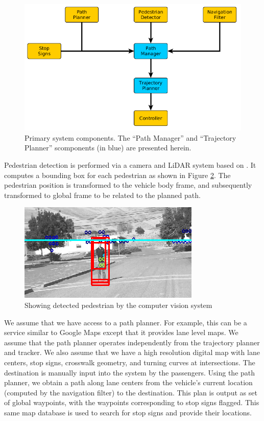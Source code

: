 \documentclass[letterpaper, 10 pt, conference]{ieeeconf}  %
\begin{document}
\begin{figure}[thpb]
  \centering
  \includegraphics[width=1.0\columnwidth]{graphics/MissingReactionPiece2.png}
  \caption{
   Primary system components. The ``Path Manager'' and ``Trajectory Planner'' scomponents (in blue) are presented herein.
  }
  \label{fig:addreact}
\end{figure}

Pedestrian detection is performed via a camera and LiDAR system based on \cite{Gepperth2013,Gepperth2014}.
It computes a bounding box for each pedestrian as shown in Figure \ref{fig:ped}.
The pedestrian position is transformed to the vehicle body frame, and subsequently transformed to global frame to be related to the planned path.

\begin{figure}[thpb]
  \centering
  \includegraphics[width=0.5\columnwidth]{graphics/ped3.png}
  \caption{Showing detected pedestrian by the computer vision system
  \newline
  }
  \label{fig:ped}
\end{figure}

We assume that we have access to a path planner.
For example, this can be a service similar to Google Maps except that it provides lane level maps. 
We assume that the path planner operates independently from the trajectory planner and tracker.
We also assume that we have a high resolution digital map with lane centers, stop signs, crosswalk geometry, and turning curves at intersections.
The destination is manually input into the system by the passengers.
Using the path planner, we obtain a path along lane centers from the vehicle's current location (computed by the navigation filter) to the destination.
This plan is output as set of global waypoints, with the waypoints corresponding to stop signs flagged.
This same map database is used to search for stop signs and provide their locations.
\end{document}
